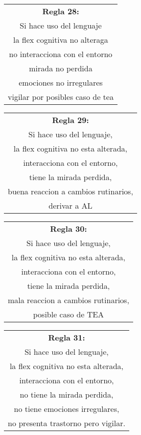 \documentclass[letterpaper,12pt]{article}
\begin{document}
\begin{center}
	\begin{tabular}{|c|}
		\hline 
		\textbf{Regla 28:} \\
		Si hace uso del lenguaje\\
		la flex cognitiva no alteraga\\
		no interacciona con el entorno\\
		mirada no perdida\\
		emociones no irregulares\\
		vigilar por posibles caso de tea\\
\hline 
\end{tabular} 
\end{center}

\begin{center}
	\begin{tabular}{|c|}
		\hline 
		\textbf{Regla 29:} \\
		Si hace uso del lenguaje,\\
		la flex cognitiva no esta alterada,\\
		interacciona con el entorno,\\
		tiene la mirada perdida,\\
		buena reaccion a cambios rutinarios,\\
		derivar a AL\\
\hline 
\end{tabular} 
\end{center}	
		
\begin{center}
	\begin{tabular}{|c|}
		\hline 
		\textbf{Regla 30:} \\
		Si hace uso del lenguaje,\\
		la flex cognitiva no esta alterada,\\
		interacciona con el entorno,\\
		tiene la mirada perdida,\\
		mala reaccion a cambios rutinarios,\\
		posible caso de TEA\\
\hline 
\end{tabular} 
\end{center}
		
\begin{center}
	\begin{tabular}{|c|}
		\hline 
		\textbf{Regla 31:} \\
		Si hace uso del lenguaje,\\
		la flex cognitiva no esta alterada,\\
		interacciona con el entorno,\\
		no tiene la mirada perdida,\\
		no tiene emociones irregulares,\\
		no presenta trastorno pero vigilar.\\
\hline 
\end{tabular} 
\end{center}
		
\end{document}
